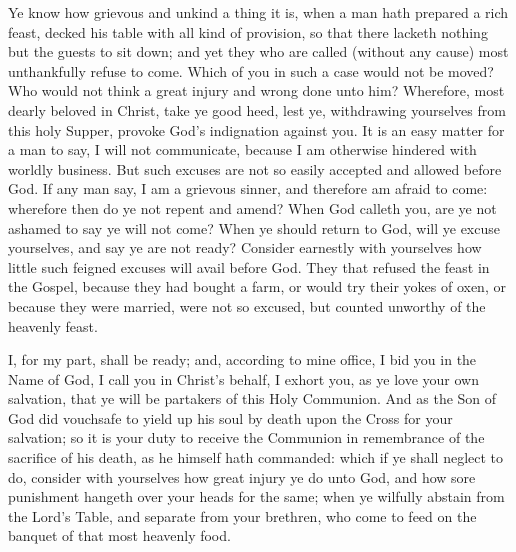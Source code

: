 
\medskip

{\centering{}\par}



Ye know how grievous and unkind a thing it is, when a man hath prepared a rich feast, decked his table with all kind of provision, so that there lacketh nothing but the guests to sit down; and yet they who are called (without any cause) most unthankfully refuse to come. Which of you in such a case would not be moved? Who would not think a great injury and wrong done unto him? Wherefore, most dearly beloved in Christ, take ye good heed, lest ye, withdrawing yourselves from this holy Supper, provoke God’s indignation against you. It is an easy matter for a man to say, I will not communicate, because I am otherwise hindered with worldly business. But such excuses are not so easily accepted and allowed before God. If any man say, I am a grievous sinner, and therefore am afraid to come: wherefore then do ye not repent and amend? When God calleth you, are ye not ashamed to say ye will not come? When ye should return to God, will ye excuse yourselves, and say ye are not ready? Consider earnestly with yourselves how little such feigned excuses will avail before God. They that refused the feast in the Gospel, because they had bought a farm, or would try their yokes of oxen, or because they were married, were not so excused, but counted unworthy of the heavenly feast.

I, for my part, shall be ready; and, according to mine office, I bid you in the Name of God, I call you in Christ’s behalf, I exhort you, as ye love your own salvation, that ye will be partakers of this Holy Communion. And as the Son of God did vouchsafe to yield up his soul by death upon the Cross for your salvation; so it is your duty to receive the Communion in remembrance of the sacrifice of his death, as he himself hath commanded: which if ye shall neglect to do, consider with yourselves how great injury ye do unto God, and how sore punishment hangeth over your heads for the same; when ye wilfully abstain from the Lord’s Table, and separate from your brethren, who come to feed on the banquet of that most heavenly food.

